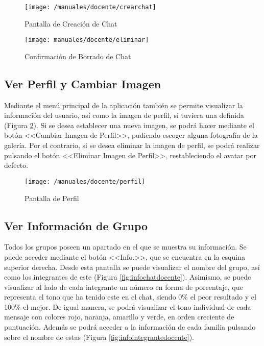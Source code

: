 \begin{figure}[!h]
	\centering
	\begin{minipage}{.5\textwidth}
		\centering
		\texttt{[image: /manuales/docente/crearchat]}
		\caption{Pantalla de Creación de Chat}
		\label{fig:crearchat}
	\end{minipage}%
	\begin{minipage}{.5\textwidth}
		\centering
		\texttt{[image: manuales/docente/eliminar]}
		\caption{Confirmación de Borrado de Chat}
		\label{fig:eliminarchat}
	\end{minipage}
\end{figure}

\clearpage

\subsection*{Ver Perfil y Cambiar Imagen}
Mediante el menú principal de la aplicación también se permite visualizar la información del usuario, así como la imagen de perfil, si tuviera una definida (Figura \ref{fig:perfildocente}). Si se desea establecer una nueva imagen, se podrá hacer mediante el botón <<Cambiar Imagen de Perfil>>, pudiendo escoger alguna fotografía de la galería. Por el contrario, si se desea eliminar la imagen de perfil, se podrá realizar pulsando el botón <<Eliminar Imagen de Perfil>>, restableciendo el avatar por defecto.

\begin{figure}[!h]
	\begin{center}
		\texttt{[image: /manuales/docente/perfil]}
		\caption{Pantalla de Perfil}
		\label{fig:perfildocente}
	\end{center}
\end{figure}

\clearpage

\subsection*{Ver Información de Grupo}
Todos los grupos poseen un apartado en el que se muestra su información. Se puede acceder mediante el botón <<Info.>>, que se encuentra en la esquina superior derecha. Desde esta pantalla se puede visualizar el nombre del grupo, así como los integrantes de este (Figura \ref{fig:infochatdocente}). Asimismo, se puede visualizar al lado de cada integrante un número en forma de porcentaje, que representa el tono que ha tenido este en el chat, siendo 0\% el peor resultado y el 100\% el mejor. De igual manera, se podrá visualizar el tono individual de cada mensaje con colores rojo, naranja, amarillo y verde, en orden creciente de puntuación. Además se podrá acceder a la información de cada familia pulsando sobre el nombre de estas (Figura \ref{fig:infointegrantedocente}).

